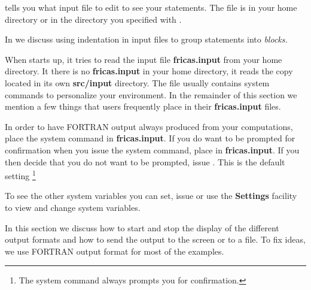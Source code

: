\Language{} tells you what input file to edit to see your
statements.
The file is in your home directory or in the directory you
specified with .
\endImportant

In 
we discuss using indentation in input files to group statements
into {\it blocks.}


When \Language{} starts up, it tries to read the input file
{\bf fricas.input} from your home
directory.
It there is no {\bf fricas.input} in your home directory, it reads the copy
located in its own {\bf src/input} directory.
The file usually contains
system commands to personalize your \Language{} environment.
In the remainder of this section we mention a few things
that users frequently place in their
{\bf fricas.input} files.

In order to have FORTRAN output always produced from your
computations, place the system command
in {\bf fricas.input}.
If you do want to be prompted for confirmation when you issue
the  system command, place
in {\bf fricas.input}.
If you then decide that you do not want to be prompted, issue
.
This is the default setting
\footnote{The
system command  always prompts you for
confirmation.}

To see the other system variables you can set, issue 
or use the \HyperName{} {\bf Settings} facility to view and change
\Language{} system variables.


In this section we discuss how to start and stop the display
of the different output formats and how to send the output to the
screen or to a file.
To fix ideas, we use FORTRAN output format for most of the
examples.

